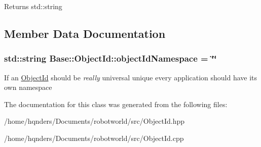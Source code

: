 \begin{DoxyReturn}{Returns}
std\+::string 
\end{DoxyReturn}


\subsection{Member Data Documentation}
\subsubsection[{\texorpdfstring{object\+Id\+Namespace}{objectIdNamespace}}]{\setlength{\rightskip}{0pt plus 5cm}std\+::string Base\+::\+Object\+Id\+::object\+Id\+Namespace = \char`\"{}\char`\"{}\hspace{0.3cm}{\ttfamily [static]}}\hypertarget{class_base_1_1_object_id_a8ccba80236842b454cf6e7dda04e12f5}{}\label{class_base_1_1_object_id_a8ccba80236842b454cf6e7dda04e12f5}
If an \hyperlink{class_base_1_1_object_id}{Object\+Id} should be {\itshape really} universal unique every application should have its own namespace 

The documentation for this class was generated from the following files\+:\begin{DoxyCompactItemize}
\item 
/home/hqnders/\+Documents/robotworld/src/Object\+Id.\+hpp\item 
/home/hqnders/\+Documents/robotworld/src/Object\+Id.\+cpp\end{DoxyCompactItemize}
